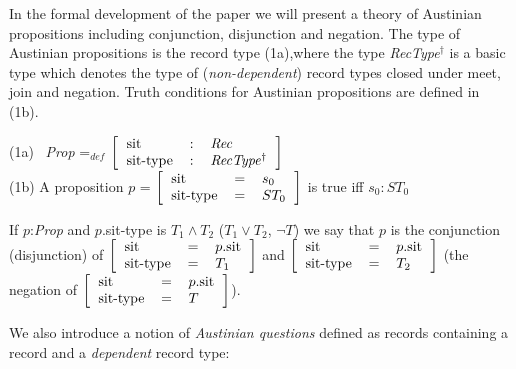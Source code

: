 \documentclass[a4wide]{article}
\newcommand{\record}[1]{$\left[\mbox{\begin{tabular}{lcl} #1
\end{tabular}}\right]$}
\newcommand{\field}[2]{#1 & = & #2}
\newcommand{\tfield}[2]{#1 & : & #2}
\begin{document}
 


In the formal development of the paper we will present a theory of
Austinian propositions including conjunction, disjunction and negation.
The type of Austinian propositions is the record type
(1a),where the type \textit{RecType}$^\dagger$ is a basic type
which denotes the type of (\textit{non-dependent}) record types closed under meet, join and
negation.  Truth conditions for Austinian propositions are defined in (1b).

\noindent (1a) \
\textit{Prop} =$_{def}$
\record{\tfield{sit}{\textit{Rec}}\\ \tfield{sit-type}{\textit{RecType}$^\dagger$}} \\
(1b) A proposition $p$ = \record{\field{sit}{$s_0$}\\
  \field{sit-type}{$ST_0$}} is true iff $s_0 : ST_0$

If $p$:\textit{Prop} and $p$.sit-type is $T_1\wedge T_2$ ($T_1\vee
T_2$, $\neg T$) we say that $p$ is the conjunction (disjunction) of
\record{\field{sit}{$p$.sit} \\
  \field{sit-type}{$T_1$}} and  \record{\field{sit}{$p$.sit} \\
  \field{sit-type}{$T_2$}} (the negation of \record{\field{sit}{$p$.sit} \\
  \field{sit-type}{$T$}}).  

We also introduce a notion of \textit{Austinian questions} defined as records
containing a
record and a \textit{dependent} record type:

\end{document}
